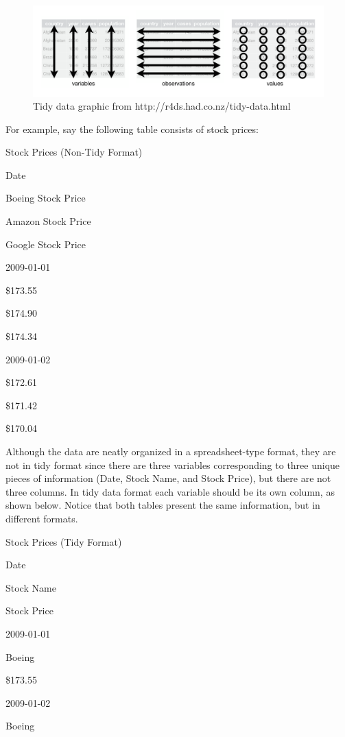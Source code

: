 \documentclass[12pt,]{krantz}
\begin{document}
\begin{figure}

{\centering \includegraphics[width=\textwidth]{images/tidy-1} 

}

\caption{Tidy data graphic from http://r4ds.had.co.nz/tidy-data.html}\label{fig:tidyfig}
\end{figure}

For example, say the following table consists of stock prices:

\label{tab:unnamed-chunk-61}Stock Prices (Non-Tidy Format)

Date

Boeing Stock Price

Amazon Stock Price

Google Stock Price

2009-01-01

\$173.55

\$174.90

\$174.34

2009-01-02

\$172.61

\$171.42

\$170.04

Although the data are neatly organized in a spreadsheet-type format,
they are not in tidy format since there are three variables
corresponding to three unique pieces of information (Date, Stock Name,
and Stock Price), but there are not three columns. In tidy data format
each variable should be its own column, as shown below. Notice that both
tables present the same information, but in different formats.

\label{tab:unnamed-chunk-62}Stock Prices (Tidy Format)

Date

Stock Name

Stock Price

2009-01-01

Boeing

\$173.55

2009-01-02

Boeing
\end{document}
